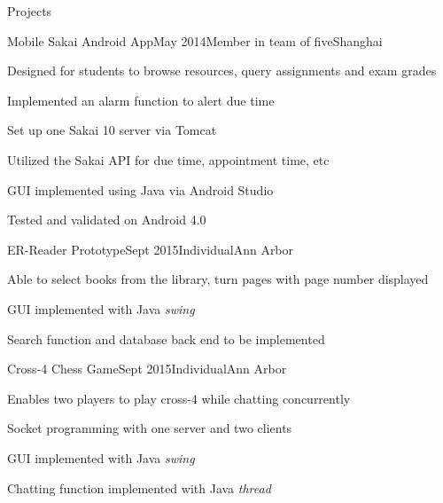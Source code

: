 \documentclass{resume} %
\begin{document}
\begin{rSection}{Projects}

	\begin{rSubsection}{Mobile Sakai Android App}{May 2014}{Member in team of five}{Shanghai}
	\item Designed for students to browse resources, query assignments and exam grades
	\item Implemented an alarm function to alert due time
	\item Set up one Sakai 10 server via Tomcat
	\item Utilized the Sakai API for due time, appointment time, etc
	\item GUI implemented using Java via Android Studio
	\item Tested and validated on Android 4.0
	\end{rSubsection}
	
	\begin{rSubsection}{ER-Reader Prototype}{Sept 2015}{Individual}{Ann Arbor}
		\item Able to select books from the library, turn pages with page number displayed
		\item GUI implemented with Java \textit{swing}
		\item Search function and database back end to be implemented
	\end{rSubsection}
	
	\begin{rSubsection}{Cross-4 Chess Game}{Sept 2015}{Individual}{Ann Arbor}
		\item Enables two players to play cross-4 while chatting concurrently
		\item Socket programming with one server and two clients
		\item GUI implemented with Java \textit{swing}
		\item Chatting function implemented with Java \textit{thread}		
	\end{rSubsection}

\end{rSection}
%
%	
\end{document}
